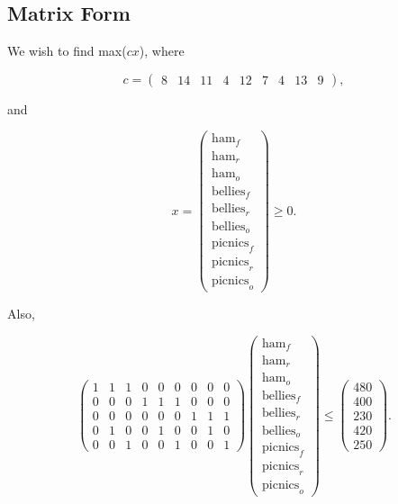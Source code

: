 \documentclass[letterpaper,10pt]{article}
\begin{document}
	\subsection{Matrix Form}
	We wish to find max($cx$), where
	
	\[
		c =
		\begin{pmatrix}
		8 & 14 & 11 & 4 & 12 & 7 & 4 & 13 & 9
		\end{pmatrix},
	\]

	and

	\[
		x =
		\begin{pmatrix}
		\text{ham}_f \\
		\text{ham}_r \\
		\text{ham}_o \\
		\text{bellies}_f \\
		\text{bellies}_r \\
		\text{bellies}_o \\
		\text{picnics}_f \\
		\text{picnics}_r \\
		\text{picnics}_o
		\end{pmatrix}
		\geq 0.
	\]

	Also,

	\[
		\begin{pmatrix}
		1 & 1 & 1 & 0 & 0 & 0 & 0 & 0 & 0 \\
		0 & 0 & 0 & 1 & 1 & 1 & 0 & 0 & 0 \\
		0 & 0 & 0 & 0 & 0 & 0 & 1 & 1 & 1 \\
		0 & 1 & 0 & 0 & 1 & 0 & 0 & 1 & 0 \\
		0 & 0 & 1 & 0 & 0 & 1 & 0 & 0 & 1
		\end{pmatrix}
		\begin{pmatrix}
		\text{ham}_f \\
		\text{ham}_r \\
		\text{ham}_o \\
		\text{bellies}_f \\
		\text{bellies}_r \\
		\text{bellies}_o \\
		\text{picnics}_f \\
		\text{picnics}_r \\
		\text{picnics}_o
		\end{pmatrix}
		\leq
		\begin{pmatrix}
		480 \\
		400 \\
		230 \\
		420 \\
		250
		\end{pmatrix}.
	\]
\end{document}
